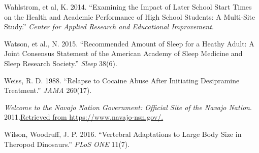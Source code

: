 \documentclass[
]{report}
\newlength{\cslhangindent}
\newenvironment{CSLReferences}[2] %
 {\begin{list}{}{%
  \setlength{\itemindent}{0pt}
  \setlength{\leftmargin}{0pt}
  \setlength{\parsep}{0pt}
  \ifodd #1
   \setlength{\leftmargin}{\cslhangindent}
   \setlength{\itemindent}{-1\cslhangindent}
  \fi
  \setlength{\itemsep}{#2\baselineskip}}}
 {\end{list}}
\begin{document}
\begin{CSLReferences}{1}{1}
{Wahlstrom, et al, K.} 2014. {``Examining the Impact of Later School Start Times on the Health and Academic Performance of High School Students: A Multi-Site Study.''} \emph{Center for Applied Research and Educational Improvement}.

{Watson, et al., N.} 2015. {``Recommended Amount of Sleep for a Heathy Adult: A Joint Consensus Statement of the American Academy of Sleep Medicine and Sleep Research Society.''} \emph{Sleep} 38(6).

Weiss, R. D. 1988. {``Relapse to Cocaine Abuse After Initiating Desipramine Treatment.''} \emph{JAMA} 260(17).

\emph{Welcome to the Navajo Nation Government: Official Site of the Navajo Nation}. 2011.\href{\%20Retrieved\%20from\%20https://www.navajo-nsn.gov/.}{Retrieved from https://www.navajo-nsn.gov/.}

Wilson, Woodruff, J. P. 2016. {``Vertebral Adaptations to Large Body Size in Theropod Dinosaurs.''} \emph{PLoS ONE} 11(7).

\end{CSLReferences}
\end{document}
